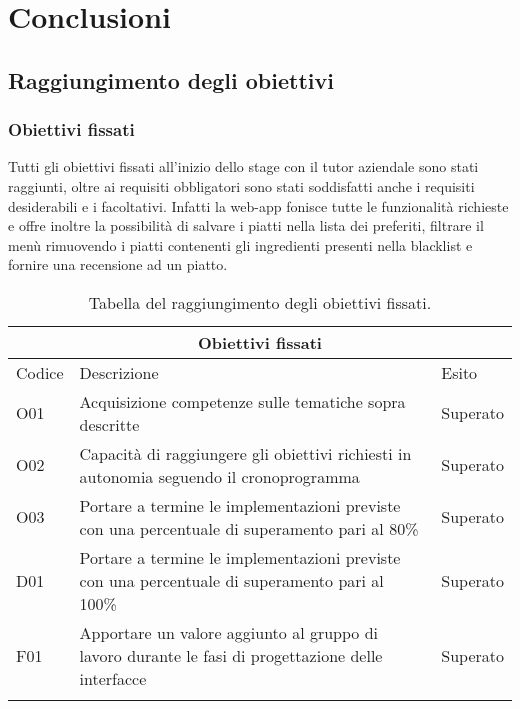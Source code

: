 
\chapter{Conclusioni}
\label{cap:conclusioni}
\section{Raggiungimento degli obiettivi}
\subsection{Obiettivi fissati}
Tutti gli obiettivi fissati all'inizio dello stage con il tutor aziendale sono stati raggiunti, oltre ai requisiti obbligatori sono stati soddisfatti anche i requisiti desiderabili e i facoltativi. Infatti la web-app fonisce tutte le funzionalità richieste e offre inoltre la possibilità di salvare i piatti nella lista dei preferiti, filtrare il menù rimuovendo i piatti contenenti gli ingredienti presenti nella blacklist e fornire una recensione ad un piatto.
\begin{center}
    \renewcommand{\arraystretch}{1.5}
    \begin{longtable}{ |p{1.5cm}|p{9cm}|p{2cm}|  }
        \hline
        \multicolumn{3}{|c|}{Obiettivi fissati} \\
        \hline
        Codice&Descrizione &Esito \\
        \hline
        \endhead
        O01&Acquisizione competenze sulle tematiche sopra descritte&Superato \\
        O02&Capacità di raggiungere gli obiettivi richiesti in autonomia seguendo il cronoprogramma&Superato\\
        O03&Portare a termine le implementazioni previste con una percentuale di superamento pari al 80\%&Superato\\
        D01&Portare a termine le implementazioni previste con una percentuale di superamento pari al 100\%&Superato\\
        F01&Apportare un valore aggiunto al gruppo di lavoro durante le fasi di progettazione delle interfacce&Superato\\
\hline
\caption{\label{tab:tabella raggiungimento obiettivi fissati}Tabella del raggiungimento degli obiettivi fissati.}
\end{longtable}
\end{center}
\pagebreak

